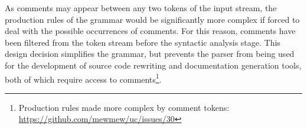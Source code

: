As comments may appear between any two tokens of the input stream, the production rules of the grammar would be significantly more complex if forced to deal with the possible occurrences of comments. For this reason, comments have been filtered from the token stream before the syntactic analysis stage. This design decision simplifies the grammar, but prevents the parser from being used for the development of source code rewriting and documentation generation tools, both of which require access to comments\footnote{Production rules made more complex by comment tokens: \url{https://github.com/mewmew/uc/issues/30}}.
